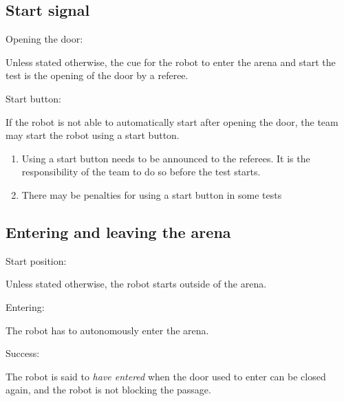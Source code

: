 \subsection{Start signal}
\label{rule:start_signal}

\begin{enumerate}
	{\bf\item Opening the door:} Unless stated otherwise, the cue for the robot to enter the arena and start the test is the opening of the door by a referee.
	{\bf\item Start button:} If the robot is not able to automatically start after opening the door, the team may start the robot using a start button. 
	\begin{enumerate}
		\item Using a start button needs to be announced to the referees. It is the responsibility of the team to do so before the test starts.
		\item There may be penalties for using a start button in some tests
	\end{enumerate}
\end{enumerate}


\subsection{Entering and leaving the arena}
\label{rule:start_position}
\begin{enumerate}
	{\bf\item Start position:} Unless stated otherwise, the robot starts outside of the arena.
	{\bf\item Entering:} The robot has to autonomously enter the arena.
	{\bf\item Success:} The robot is said to \emph{have entered} when the door used to enter can be closed again, and the robot is not blocking the passage.
\end{enumerate}



